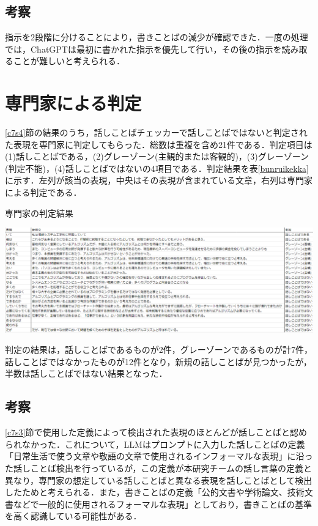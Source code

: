 \subsection{考察}
指示を2段階に分けることにより，書きことばの減少が確認できた．一度の処理では，ChatGPTは最初に書かれた指示を優先して行い，その後の指示を読み取ることが難しいと考えられる．

\section{専門家による判定}
\ref{c7s4}節の結果のうち，話しことばチェッカーで話しことばではないと判定された表現を専門家に判定してもらった．総数は重複を含め21件である．判定項目は(1)話しことばである，(2)グレーゾーン(主観的または客観的)，(3)グレーゾーン(判定不能)，(4)話しことばではないの4項目である．判定結果を表\ref{bunruikekka}に示す．左列が該当の表現，中央はその表現が含まれている文章，右列は専門家による判定である．

\begin{table}[H]
	\centering
        \caption{専門家の判定結果}
 	\includegraphics[width=150mm]{image/result-bunruikekka.png}
	\label{bunruikekka}
\end{table}

判定の結果は，話しことばであるものが2件，グレーゾーンであるものが計7件，話しことばではなかったものが12件となり，新規の話しことばが見つかったが，半数は話しことばではない結果となった．

\subsection{考察}
\ref{c7s3}節で使用した定義によって検出された表現のほとんどが話しことばと認められなかった．これについて，LLMはプロンプトに入力した話しことばの定義「日常生活で使う文章や敬語の文章で使用されるインフォーマルな表現」に沿った話しことば検出を行っているが，この定義が本研究チームの話し言葉の定義と異なり，専門家の想定している話しことばと異なる表現を話しことばとして検出したためと考えられる．また，書きことばの定義「公的文書や学術論文、技術文書などで一般的に使用されるフォーマルな表現」としており，書きことばの基準を高く認識している可能性がある．